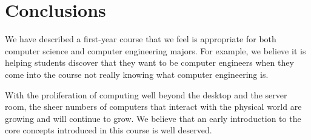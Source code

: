 \section{Conclusions}
\label{sec:conclude}

We have described a first-year course that we feel is appropriate
for both computer science and computer engineering majors. For example,
we believe it is helping students discover
that they want to be computer engineers when they come into the course
not really knowing what computer engineering is.

With the proliferation of
computing well beyond the desktop and the server room, the sheer numbers
of computers that interact with the physical world are growing and
will continue to grow.
We believe that an early introduction to the core concepts
introduced in this course is well deserved.
